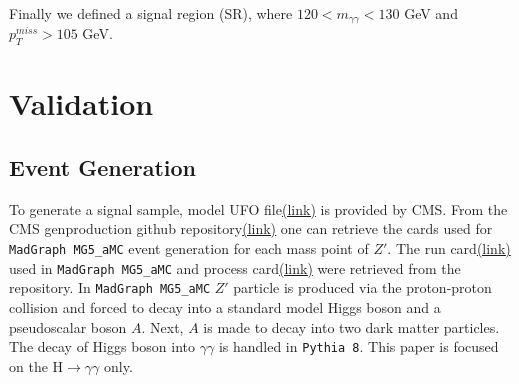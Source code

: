 \documentclass[12pt,A4paper]{article}
\begin{document}
Finally we defined a signal region (SR), where $120 < m_{\gamma\gamma} < 130$ GeV and $p_T^{miss} > 105$ GeV.


\section{Validation}
\subsection{Event Generation}
To generate a signal sample, model UFO file\href{http://rkhurana.web.cern.ch/rkhurana/monoH/models/}{(link)} is provided by CMS. From the CMS genproduction github repository\href{https://github.com/cms-sw/genproductions/tree/master/bin/MadGraph5_aMCatNLO/cards/production/13TeV/monoHiggs/Zp2HDM/Zprime_A0h_A0chichi}{(link)}\cite{ref:gitgen} one can retrieve the cards used for \texttt{MadGraph MG5\_aMC}\cite{ref:mg5} event generation for each mass point of $Z'$. 
The run card\href{https://github.com/cms-sw/genproductions/blob/mg240/bin/MadGraph5_aMCatNLO/cards/production/13TeV/monoHiggs/Zp2HDM/Zprime_A0h_A0chichi/Zprime_A0h_A0chichi_MZp600_MA0300/Zprime_A0h_A0chichi_MZp600_MA0300_run_card.dat}{(link)} used in \texttt{MadGraph MG5\_aMC} and process card\href{https://github.com/cms-sw/genproductions/blob/mg240/bin/MadGraph5_aMCatNLO/cards/production/13TeV/monoHiggs/Zp2HDM/Zprime_A0h_A0chichi/Zprime_A0h_A0chichi_MZp600_MA0300/Zprime_A0h_A0chichi_MZp600_MA0300_proc_card.dat}{(link)} were retrieved from the repository. 
In \texttt{MadGraph MG5\_aMC} $Z'$ particle is produced via the proton-proton collision and forced to decay into a standard model Higgs boson and a pseudoscalar boson $A$. 
Next, $A$ is made to decay into two dark matter particles. The decay of Higgs boson into $\gamma\gamma$ is handled in \texttt{Pythia 8}\cite{ref:pythia}. This paper is focused on the H$\rightarrow\gamma\gamma$ only.
\end{document}
